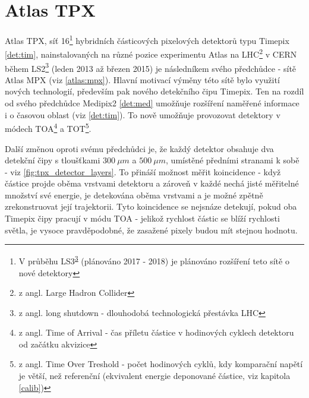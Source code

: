 

\chapter{Atlas TPX}\label{atlas}
Atlas TPX, síť 16\footnote{V průběhu LS3\textsuperscript{\ref{ls}} (plánováno 2017 - 2018) je plánováno rozšíření teto sítě o nové detektory} hybridních částicových pixelových detektorů typu Timepix \ref{det:tim}, nainstalovaných na různé pozice experimentu Atlas na LHC\footnote{z angl. Large Hadron Collider} v CERN během LS2\footnote{\label{ls}z angl. long shutdown - dlouhodobá technologická přestávka LHC} (leden 2013 až březen 2015) je následníkem svého předchůdce - sítě Atlas MPX (viz \ref{atlas:mpx}). Hlavní motivací výměny této sítě bylo využití nových technologií, především pak nového detekčního čipu Timepix. Ten na rozdíl od svého předchůdce Medipix2 \ref{det:med} umožňuje rozšíření naměřené informace i o časovou oblast (viz \ref{det:tim}). To nově umožňuje provozovat detektory v módech TOA\footnote{z angl. Time of Arrival - čas příletu částice v hodinových cyklech detektoru od začátku akvizice} a TOT\footnote{z angl. Time Over Treshold - počet hodinových cyklů, kdy komparační napětí je větší, než referenční (ekvivalent energie deponované částice, viz kapitola \ref{calib})}. 

Další změnou oproti svému předchůdci je, že každý detektor obsahuje dva detekční čipy s tloušťkami $300~\mu m$ a $500~\mu m$, umístěné předními stranami k sobě - viz \ref{fig:tpx_detector_layers}. To přináší možnost měřit koincidence - když částice projde oběma vrstvami  detektoru a zároveň v každé nechá jisté měřitelné množství své energie, je detekována oběma vrstvami a je možné zpětně zrekonstruovat její trajektorii. Tyto koincidence se nejsnáze detekují, pokud oba Timepix čipy pracují v módu TOA - jelikož rychlost částic se blíží rychlosti světla, je vysoce pravděpodobné, že zasažené pixely budou mít stejnou hodnotu.


